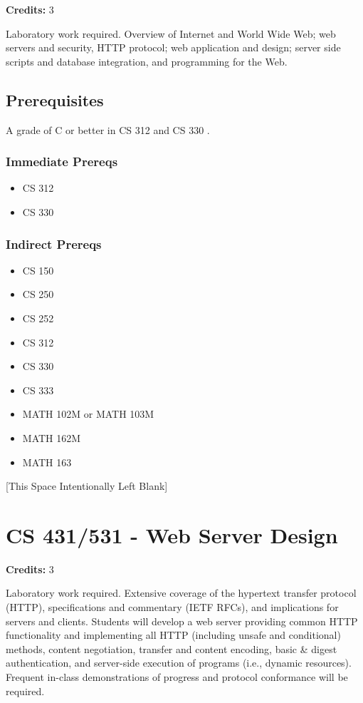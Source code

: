 \documentclass[]{article}
\providecommand{\tightlist}{%
  \setlength{\itemsep}{0pt}\setlength{\parskip}{0pt}}
\newcommand{\pagebreakhere}{
\vspace*{\fill}
\begin{center}
[This Space Intentionally Left Blank]
\end{center}
\vspace*{\fill}
\newpage
}
\begin{document}
\textbf{Credits:} 3

Laboratory work required. Overview of Internet and World Wide Web; web
servers and security, HTTP protocol; web application and design; server
side scripts and database integration, and programming for the Web.

\subsection{Prerequisites}\label{prerequisites-29}

A grade of C or better in CS 312 and CS 330 .

\subsubsection{Immediate Prereqs}\label{immediate-prereqs-21}

\begin{itemize}
\tightlist
\item
  CS 312
\item
  CS 330
\end{itemize}

\subsubsection{Indirect Prereqs}\label{indirect-prereqs-21}

\begin{itemize}
\tightlist
\item
  CS 150
\item
  CS 250
\item
  CS 252
\item
  CS 312
\item
  CS 330
\item
  CS 333
\item
  MATH 102M or MATH 103M
\item
  MATH 162M
\item
  MATH 163
\end{itemize}

\pagebreakhere
\section{CS 431/531 - Web Server
Design}\label{cs-431531---web-server-design}

\textbf{Credits:} 3

Laboratory work required. Extensive coverage of the hypertext transfer
protocol (HTTP), specifications and commentary (IETF RFCs), and
implications for servers and clients. Students will develop a web server
providing common HTTP functionality and implementing all HTTP (including
unsafe and conditional) methods, content negotiation, transfer and
content encoding, basic \& digest authentication, and server-side
execution of programs (i.e., dynamic resources). Frequent in-class
demonstrations of progress and protocol conformance will be required.
\end{document}
